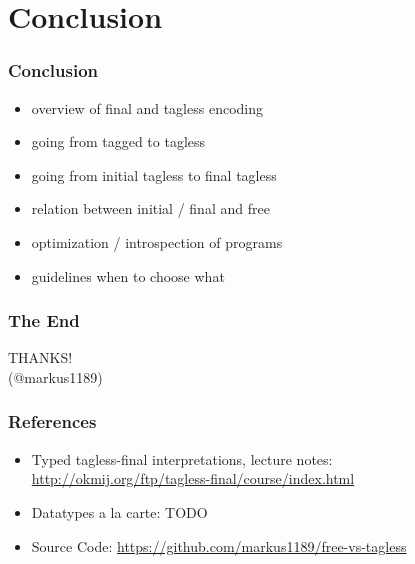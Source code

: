 \documentclass[aspectratio=169, hyperref={colorlinks, linkcolor=beamer@centricgreen}, urlcolor=links]{beamer}
\begin{document}
\section{Conclusion}\label{sec:conclusion}

\begin{frame}
  \frametitle{Conclusion}
  \begin{itemize}
  \item overview of final and tagless encoding
  \item going from tagged to tagless
  \item going from initial tagless to final tagless
  \item relation between initial / final and free
  \item optimization / introspection of programs
  \item guidelines when to choose what
  \end{itemize}
\end{frame}

\begin{frame}
  \frametitle{The End}
  \begin{center}
    {
      \Huge
      THANKS!\\
    }
    \vfill
    (@markus1189)
  \end{center}
\end{frame}

\begin{frame}
  \frametitle{References}
  \begin{center}
    \begin{itemize}
    \item Typed tagless-final interpretations, lecture notes: \href{http://okmij.org/ftp/tagless-final/course/index.html}{http://okmij.org/ftp/tagless-final/course/index.html}
    \item Datatypes a la carte: TODO
    \item Source Code: \href{https://github.com/markus1189/free-vs-tagless}{https://github.com/markus1189/free-vs-tagless}
    \end{itemize}
  \end{center}
\end{frame}

\appendix{}
\end{document}
